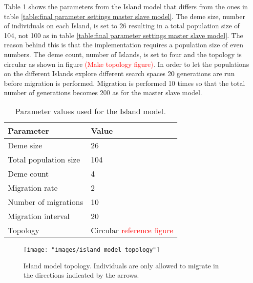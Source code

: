 \documentclass[12pt]{report}
\begin{document}
\noindent Table \ref{table:final parameter settings island model} shows the parameters from the Island model that differs from the ones in table \ref{table:final parameter settings master slave model}. The deme size, number of individuals on each Island, is set to 26 resulting in a total population size of 104, not 100 as in table \ref{table:final parameter settings master slave model}. The reason behind this is that the implementation requires a population size of even numbers. The deme count, number of Islands, is set to four and the topology is circular as shown in figure \textcolor{red}{(Make topology figure)}. In order to let the populations on the different Islands explore different search spaces 20 generations are run before migration is performed. Migration is performed 10 times so that the total number of generations becomes 200 as for the master slave model. \\


\begin{table}
\centering
\caption{Parameter values used for the Island model.}
\label{table:final parameter settings island model}
\begin{tabular}{l|l}
\textbf{Parameter} & \textbf{Value} \\ 
\hline 
Deme size & 26 \\
Total population size & 104 \\  
Deme count & 4 \\
Migration rate & 2 \\
Number of migrations & 10 \\ 
Migration interval & 20 \\
Topology & Circular  \textcolor{red}{reference figure} \\
\end{tabular}
\end{table}


\begin{figure}
\centering
\texttt{[image: "images/island model topology"]}
\caption{Island model topology. Individuals are only allowed to migrate in the directions indicated by the arrows.}
\label{figure:islandsland Modell titeritroexThThe hets difsH." model topology}
\end{figure}
\end{document}
